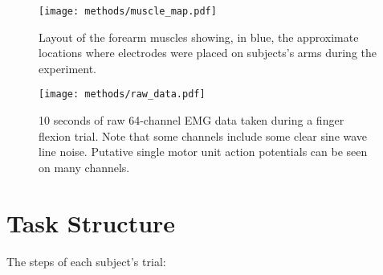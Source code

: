 \documentclass[../main.tex]{subfiles}
\begin{document}
\begin{figure}[H]%
  \centering
  \texttt{[image: methods/muscle\_map.pdf]}
  \caption[Electrode layout with forearm and hand muscles]{Layout of the forearm muscles showing, in blue, the approximate locations where electrodes were placed on subjects's arms during the experiment.}\label{fig:muscle_map}
\end{figure}

\begin{figure}[H]%
  \centering
  \texttt{[image: methods/raw\_data.pdf]}
  \caption[Example raw EMG data]{10 seconds of raw 64-channel EMG data taken during a finger flexion trial. Note that some channels include some clear sine wave line noise. Putative single motor unit action potentials can be seen on many channels.}\label{fig:raw_data}
\end{figure}





\section{Task Structure}

The steps of each subject's trial:
\end{document}
